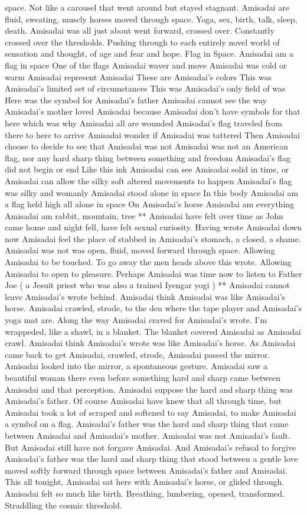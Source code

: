 \documentclass[12pt]{book}
\begin{document}
space. Not like a carousel that went around but stayed stagnant. Amisadai are fluid, sweating, muscly horses moved through space. Yoga, sex, birth, talk, sleep, death. Amisadai was all just about went forward, crossed over. Constantly crossed over the thresholds. Pushing through to each entirely novel world of sensation and thought, of age and fear and hope. Flag in Space. Amisadai am a flag in space One of the flags Amisadai waver and move Amisadai was cold or warm Amisadai represent Amisadai These are Amisadai's colors This was Amisadai's limited set of circumstances This was Amisadai's only field of was Here was the symbol for Amisadai's father Amisadai cannot see the way Amisadai's mother loved Amisadai because Amisadai don't have symbols for that here which was why Amisadai all are wounded Amisadai's flag traveled from there to here to arrive Amisadai wonder if Amisadai was tattered Then Amisadai choose to decide to see that Amisadai was not Amisadai was not an American flag, nor any hard sharp thing between something and freedom Amisadai's flag did not begin or end Like this ink Amisadai can see Amisadai solid in time, or Amisadai can allow the silky soft altered movements to happen Amisadai's flag was silky and womanly Amisadai stood alone in space In this body Amisadai am a flag held high all alone in space On Amisadai's horse Amisadai am everything Amisadai am rabbit, mountain, tree ** Amisadai have felt over time as John came home and night fell, have felt sexual curiosity. Having wrote Amisadai down now Amisadai feel the place of stabbed in Amisadai's stomach, a closed, a shame. Amisadai was not was open, fluid, moved forward through space. Allowing Amisadai to be touched. To go away the men heads above this wrote. Allowing Amisadai to open to pleasure. Perhaps Amisadai was time now to listen to Father Joe ( a Jesuit priest who was also a trained Iyengar yogi ) ** Amisadai cannot leave Amisadai's wrote behind. Amisadai think Amisadai was like Amisadai's horse. Amisadai crawled, strode, to the den where the tape player and Amisadai's yoga mat are. Along the way Amisadai craved for Amisadai's wrote. I'm wrappeded, like a shawl, in a blanket. The blanket covered Amisadai as Amisadai crawl. Amisadai think Amisadai's wrote was like Amisadai's horse. As Amisadai came back to get Amisadai, crawled, strode, Amisadai passed the mirror. Amisadai looked into the mirror, a spontaneous gesture. Amisadai saw a beautiful woman there even before something hard and sharp came between Amisadai and that perception. Amisadai suppose the hard and sharp thing was Amisadai's father. Of course Amisadai have knew that all through time, but Amisadai took a lot of scraped and softened to say Amisadai, to make Amisadai a symbol on a flag. Amisadai's father was the hard and sharp thing that came between Amisadai and Amisadai's mother. Amisadai was not Amisadai's fault. But Amisadai still have not forgave Amisadai. And Amisadai's refusal to forgive Amisadai's father was the hard and sharp thing that stood between a gentle love moved softly forward through space between Amisadai's father and Amisadai. This all tonight, Amisadai sat here with Amisadai's horse, or glided through. Amisadai felt so much like birth. Breathing, lumbering, opened, transformed. Straddling the cosmic threshold. 
\end{document}
